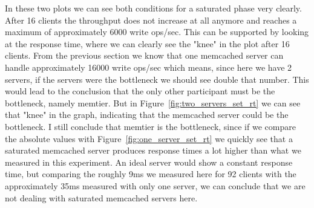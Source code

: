 \documentclass[11pt,a4paper]{article}
\begin{document}
%
In these two plots we can see both conditions for a saturated phase very clearly.
%
After 16 clients the throughput does not increase at all anymore and reaches a maximum of approximately 6000 write ops/sec.
%
This can be supported by looking at the response time, where we can clearly see the "knee" in the plot after 16 clients.
%
From the previous section we know that one memcached server can handle approximately 16000 write ops/sec which means, since here we have 2 servers, if the servers were the bottleneck we should see double that number.
%
This would lead to the conclusion that the only other participant must be the bottleneck, namely memtier.
%
But in Figure~\ref{fig:two_servers_set_rt} we can see that "knee" in the graph, indicating that the memcached server could be the bottleneck.
%
I still conclude that memtier is the bottleneck, since if we compare the absolute values with Figure~\ref{fig:one_server_set_rt} we quickly see that a saturated memcached server produces response times a lot higher than what we measured in this experiment.
%
An ideal server would show a constant response time, but comparing the roughly 9ms we measured here for 92 clients with the approximately 35ms measured with only one server, we can conclude that we are not dealing with saturated memcached servers here.
%
\end{document}
